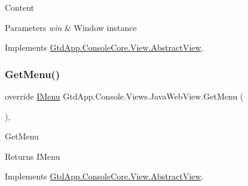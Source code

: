 Content 


\begin{DoxyParams}{Parameters}
{\em win} & Window instance\\
\hline
\end{DoxyParams}


Implements \mbox{\hyperlink{class_gtd_app_1_1_console_core_1_1_view_1_1_abstract_view_a8c518373e635d19875713f2b9f2e1592}{Gtd\+App.\+Console\+Core.\+View.\+Abstract\+View}}.

\mbox{\label{class_gtd_app_1_1_console_1_1_views_1_1_java_web_view_ad7e12e20b33449a8f0b95dbcf47c4602}} 
\subsubsection{\texorpdfstring{Get\+Menu()}{GetMenu()}}
{\footnotesize\ttfamily override \mbox{\hyperlink{interface_gtd_app_1_1_console_core_1_1_menu_1_1_i_menu}{I\+Menu}} Gtd\+App.\+Console.\+Views.\+Java\+Web\+View.\+Get\+Menu (\begin{DoxyParamCaption}{ }\end{DoxyParamCaption})\hspace{0.3cm}{\ttfamily [protected]}, {\ttfamily [virtual]}}



Get\+Menu 

\begin{DoxyReturn}{Returns}
I\+Menu
\end{DoxyReturn}


Implements \mbox{\hyperlink{class_gtd_app_1_1_console_core_1_1_view_1_1_abstract_view_a04360e549fc462f357300c59fa7fadab}{Gtd\+App.\+Console\+Core.\+View.\+Abstract\+View}}.

\mbox{\label{class_gtd_app_1_1_console_1_1_views_1_1_java_web_view_ac03ca3383ead82e7775e417db086ac76}} 
